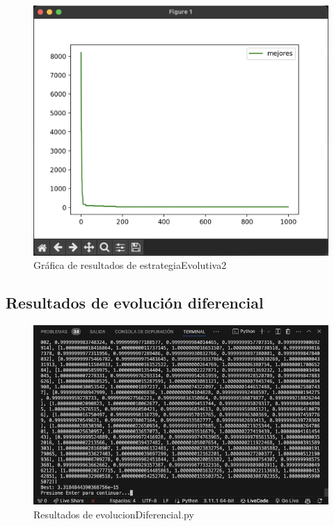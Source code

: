 \documentclass{report}
\begin{document}
\begin{figure}[H]
    \centering
    \includegraphics[width=1\textwidth]{graficaev2.png}
    \caption{Gráfica de resultados de estrategiaEvolutiva2}
\end{figure}

\subsection{Resultados de evolución diferencial}
\begin{figure}[H]
    \centering
    \includegraphics[width=1\textwidth]{evDif.png}
    \caption{Resultados de evolucionDiferencial.py}
\end{figure}
\end{document}
